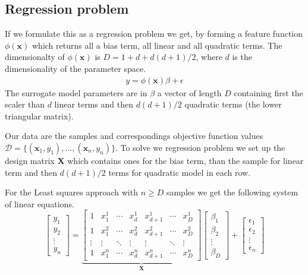 \subsection{Regression problem}
If we formulate this as a regression problem we get, by forming
a feature function $\phi(\mathbf{x})$ which returns all
a bias term, all linear and all quadratic terms. The dimensionalty of
$\phi(\mathbf{x})$ is $D = 1 + d + d(d + 1) / 2$, where $d$
is the dimensionality of the parameter space.
\begin{align*}
  y = \phi(\mathbf{x}) \beta + \epsilon
\end{align*}
The surrogate model parameters are in $\beta$
a vector of length $D$ containing first the
scaler than $d$ linear terms and then $d(d+1) /2$ quadratic terms
(the lower triangular matrix).

Our data are the samples and correspondings objective function
values $\mathcal{D} = \{(\mathbf{x}_1, y_1),...,(\mathbf{x}_n, y_n)\}$.
To solve we regression problem we set up
the design matrix $\mathbf{X}$ which contains 
ones for the bias term, than the sample for linear term and then
$d(d+1) /2$ terms for quadratic model in each row.

For the Least squares approach with $n \geq D$ samples
we get the following system of linear equations. 
$$
\begin{bmatrix} y_1 \\ y_2 \\ \vdots \\ y_n \end{bmatrix}
=
\underbrace{
\begin{bmatrix}
  1 & x_1^1 & \cdots & x_d^1  & x_{d+1}^1 & \cdots &  x_{D}^1 \\
  1 & x_1^2 & \cdots &  x_d^2 & x_{d+1}^2 & \cdots &  x_{D}^2 \\
  \vdots  & \vdots & \ddots & \vdots &  \vdots & \ddots & \vdots \\
  1 & x_1^n & \cdots &  x_d^n & x_{d+1}^n & \cdots &  x_{D}^n
\end{bmatrix}}_{\mathbf{X}}
\begin{bmatrix}
  \beta_1 \\ \beta_2 \\ \vdots \\ \beta_D
\end{bmatrix}
+
\begin{bmatrix}
  \epsilon_1 \\
  \epsilon_2 \\
  \vdots \\
  \epsilon_n
\end{bmatrix}
$$


